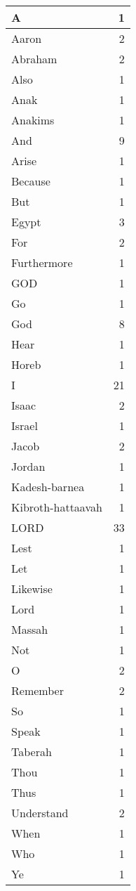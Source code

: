 \begin{center}
\begin{longtable}{l|r}
\hline \hline
\endlastfoot
A & 1 \\ \hline
Aaron & 2 \\ \hline
Abraham & 2 \\ \hline
Also & 1 \\ \hline
Anak & 1 \\ \hline
Anakims & 1 \\ \hline
And & 9 \\ \hline
Arise & 1 \\ \hline
Because & 1 \\ \hline
But & 1 \\ \hline
Egypt & 3 \\ \hline
For & 2 \\ \hline
Furthermore & 1 \\ \hline
GOD & 1 \\ \hline
Go & 1 \\ \hline
God & 8 \\ \hline
Hear & 1 \\ \hline
Horeb & 1 \\ \hline
I & 21 \\ \hline
Isaac & 2 \\ \hline
Israel & 1 \\ \hline
Jacob & 2 \\ \hline
Jordan & 1 \\ \hline
Kadesh-barnea & 1 \\ \hline
Kibroth-hattaavah & 1 \\ \hline
LORD & 33 \\ \hline
Lest & 1 \\ \hline
Let & 1 \\ \hline
Likewise & 1 \\ \hline
Lord & 1 \\ \hline
Massah & 1 \\ \hline
Not & 1 \\ \hline
O & 2 \\ \hline
Remember & 2 \\ \hline
So & 1 \\ \hline
Speak & 1 \\ \hline
Taberah & 1 \\ \hline
Thou & 1 \\ \hline
Thus & 1 \\ \hline
Understand & 2 \\ \hline
When & 1 \\ \hline
Who & 1 \\ \hline
Ye & 1 \\ \hline

\end{longtable}
\end{center}

